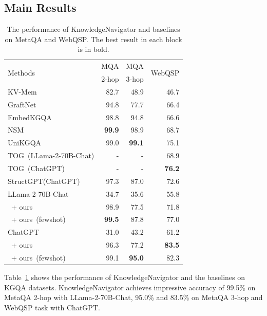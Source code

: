 \documentclass{article}
\begin{document}
\subsection{Main Results}
\begin{table}
    \centering
    \begin{tabular}{lrrr}
        \toprule
        \multirow{2}{*}{Methods} & \multicolumn{1}{c}{MQA} & \multicolumn{1}{c}{MQA} & \multirow{2}{*}{WebQSP} \\
        & \multicolumn{1}{c}{2-hop} & \multicolumn{1}{c}{3-hop} & \\
        \midrule
        KV-Mem     & 82.7    & 48.9 & 46.7 \\
        GraftNet   & 94.8    & 77.7 & 66.4 \\
        EmbedKGQA  & 98.8    & 94.8 & 66.6 \\
        NSM        & \textbf{99.9}    & 98.9 & 68.7 \\
        UniKGQA    & 99.0    & \textbf{99.1} & 75.1 \\
        TOG~(LLama-2-70B-Chat)  & -       & -    & 68.9 \\
        TOG~(ChatGPT)  & -       & -    & \textbf{76.2} \\
        StructGPT(ChatGPT)    & 97.3    & 87.0 & 72.6 \\
        \midrule
        LLama-2-70B-Chat   & 34.7  & 35.6  & 55.8 \\ 
        ~+ ours            & 98.9  & 77.5  & 71.8 \\
        ~+ ours~(fewshot)  & \textbf{99.5} & 87.8  & 77.0 \\
        ChatGPT            & 31.0  & 43.2   & 61.2  \\
        ~+ ours            & 96.3  & 77.2  & \textbf{83.5}  \\
        ~+ ours~(fewshot)  & 99.1  & \textbf{95.0}  & 82.3  \\
        \bottomrule
    \end{tabular}
    \caption{The performance of KnowledgeNavigator and baselines on MetaQA and WebQSP. The best result in each block is in bold.}
    \label{tab:main result}
\end{table}




Table~\ref{tab:main result} shows the performance of KnowledgeNavigator and the baselines on KGQA datasets. KnowledgeNavigator achieves impressive accuracy of 99.5\% on MetaQA 2-hop with LLama-2-70B-Chat, 95.0\% and 83.5\% on MetaQA 3-hop and WebQSP task with ChatGPT.
\end{document}
